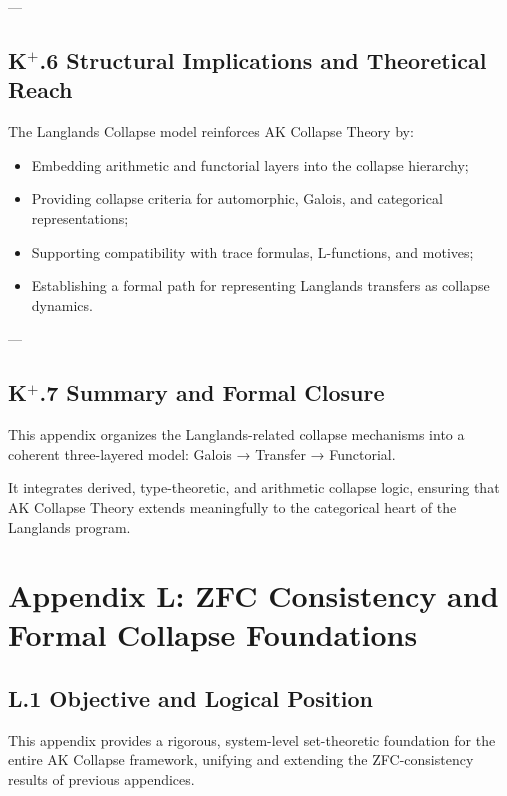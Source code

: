 \documentclass[11pt]{article}
\begin{document}
---

\subsection*{K$^{+}$.6 Structural Implications and Theoretical Reach}

The Langlands Collapse model reinforces AK Collapse Theory by:

\begin{itemize}
    \item Embedding arithmetic and functorial layers into the collapse hierarchy;
    \item Providing collapse criteria for automorphic, Galois, and categorical representations;
    \item Supporting compatibility with trace formulas, L-functions, and motives;
    \item Establishing a formal path for representing Langlands transfers as collapse dynamics.
\end{itemize}

---

\subsection*{K$^{+}$.7 Summary and Formal Closure}

This appendix organizes the Langlands-related collapse mechanisms into a coherent three-layered model: Galois → Transfer → Functorial.

It integrates derived, type-theoretic, and arithmetic collapse logic, ensuring that AK Collapse Theory extends meaningfully to the categorical heart of the Langlands program.



\section*{Appendix L: ZFC Consistency and Formal Collapse Foundations}

\subsection*{L.1 Objective and Logical Position}

This appendix provides a rigorous, system-level set-theoretic foundation for the entire AK Collapse framework, unifying and extending the ZFC-consistency results of previous appendices.
\end{document}
